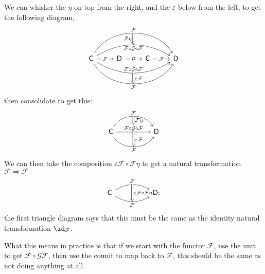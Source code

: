 \documentclass[main.tex]{subfiles}
\begin{document}
We can whisker the $\eta$ on top from the right, and the $\varepsilon$ below from the left, to get the following diagram,
\begin{equation*}
  \begin{tikzcd}
    \mathsf{C}
    \arrow[r, rightarrow, "\mathcal{F}" description]
    \arrow[rrr, rightarrow, bend right=60, swap, "\mathcal{F}"{name=D}]
    \arrow[rrr, rightarrow, bend left=60, "\mathcal{F}"{name=U}]
    \arrow[rrr, rightarrow, bend left=30, swap, "\mathcal{F} \circ \mathcal{G} \circ \mathcal{F}"{name=MU}]
    \arrow[rrr, rightarrow, bend right=30, "\mathcal{F} \circ \mathcal{G} \circ \mathcal{F}"{name=MD}]
    & \mathsf{D}
    \arrow[from=U, to=MU, Rightarrow, swap, "\mathcal{F}\eta"]
    \arrow[r, rightarrow, "\mathcal{G}" description]
    \arrow[from=MD, to=D, Rightarrow, "\varepsilon\mathcal{F}"]
    & \mathsf{C}
    \arrow[r, rightarrow, "\mathcal{F}" description]
    & \mathsf{D}
  \end{tikzcd}
\end{equation*}
then consolidate to get this:
\begin{equation*}
  \begin{tikzcd}[row sep=huge, column sep=huge]
    \mathsf{C}
    \arrow[r, rightarrow, bend left=60, "\mathcal{F}"{name=U}]
    \arrow[r, rightarrow, "\mathcal{F} \circ \mathcal{G} \circ \mathcal{F}"{name=M} description]
    \arrow[r, rightarrow, bend right=60, swap, "\mathcal{F}"{name=D}]
    & \mathsf{D}
    \arrow[from=U, to=M, Rightarrow, "\mathcal{F}\eta"]
    \arrow[from=M, to=D, Rightarrow, "\varepsilon\mathcal{F}"]
  \end{tikzcd}
\end{equation*}
We can then take the composition $\varepsilon \mathcal{F} \circ \mathcal{F}\eta$ to get a natural transformation $\mathcal{F} \Rightarrow \mathcal{F}$
\begin{equation*}
  \begin{tikzcd}[row sep=huge, column sep=huge]
    \mathsf{C}
    \arrow[r, bend left, rightarrow, "\mathcal{F}"{name=U}]
    \arrow[r, bend right, swap, rightarrow, "\mathcal{F}"{name=D}]
    \arrow[from=U, to=D, Rightarrow, "\varepsilon\mathcal{F} \circ \mathcal{F}\eta"]
    &\mathsf{D};
  \end{tikzcd}
\end{equation*}
the first triangle diagram says that this must be the same as the identity natural transformation $\id_{\mathcal{F}}$.

What this means in practice is that if we start with the functor $\mathcal{F}$, use the unit to get $\mathcal{F} \circ \mathcal{G} \mathcal{F}$, then use the counit to map back to $\mathcal{F}$, this should be the same as not doing anything at all.
\end{document}
